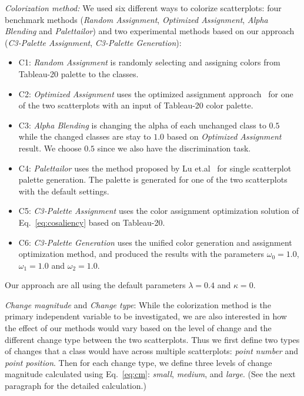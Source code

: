 \emph{Colorization method:} We used six different ways to colorize scatterplots: four benchmark methods (\emph{Random Assignment}, \emph{Optimized Assignment}, \emph{Alpha Blending} and \emph{Palettailor}) and two experimental methods based on our approach (\emph{C3-Palette Assignment}, \emph{C3-Palette Generation}):
\begin{itemize}

     \item C1: \emph{Random Assignment} is randomly selecting and assigning colors from Tableau-20 palette to the classes.

     \item C2: \emph{Optimized Assignment} uses the optimized assignment approach~\cite{Wang2018} for one of the two scatterplots with an input of Tableau-20 color palette.

     \item C3: \emph{Alpha Blending} is changing the alpha of each unchanged class to $0.5$ while the changed classes are stay to $1.0$ based on \emph{Optimized Assignment} result. We choose $0.5$ since we also have the discrimination task.
     \item C4: \emph{Palettailor} uses the method proposed by Lu et.al~\cite{Lu21} for single scatterplot palette generation. The palette is generated for one of the two scatterplots with the default settings.
     \item C5: \emph{C3-Palette Assignment} uses the color assignment optimization solution of Eq.~\ref{eq:cosaliency} based on Tableau-20.
     \item C6: \emph{C3-Palette Generation} uses the unified color generation and assignment optimization method, and produced the results with the parameters $\omega_0=1.0$, $\omega_1=1.0$ and $\omega_2=1.0$.
\end{itemize}
Our approach are all using the default parameters $\lambda=0.4$ and $\kappa=0$.

\emph{Change magnitude} and \emph{Change type}: While the colorization method is the primary independent variable to be investigated, we are also interested in how the effect of our methods would vary based on the level of change and the different change type between the two scatterplots. Thus we first define two types of changes that a class would have across multiple scatterplots: \emph{point number} and \emph{point position}. Then for each change type, we define three levels of change magnitude calculated using Eq.~\ref{eq:cm}: \emph{small}, \emph{medium}, and \emph{large}. (See the next paragraph for the detailed calculation.)

